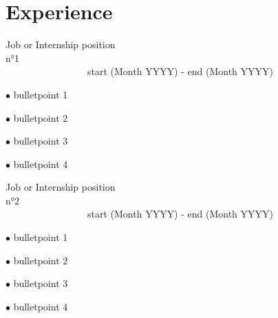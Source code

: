 \documentclass[letterpaper]{article}
\renewenvironment{itemize}{
	\begin{list}{}{
			\setlength{\leftmargin}{1.5em}
		}
	}{
	\end{list}
}
\begin{document}
	\section*{Experience} %
	\begin{itemize}
		\item Job or Internship position n°1\ \ \ \ \ \ \ \ \ \ \ \ \ \ \ \ \ \ \ \ \ \ \ \ \ \ \ \ \ \ \ \ \ \ \ \ \ \ \ \ \ \ \ \ \ \ \ \ \ \ \ \ \ \ \ \ \ \ \ \ \ \ \ \ \ \ \ \ \ \ \ \ \ \ \ \ \ \ \ \ \ \ \ \ \ \ start (Month YYYY) - end (Month YYYY)
		\begin{itemize} %
			\item $\bullet$ bulletpoint 1

			\item $\bullet$ bulletpoint 2

			\item $\bullet$ bulletpoint 3

			\item $\bullet$ bulletpoint 4
		\end{itemize}

		\item Job or Internship position n°2\ \ \ \ \ \ \ \ \ \ \ \ \ \ \ \ \ \ \ \ \ \ \ \ \ \ \ \ \ \ \ \ \ \ \ \ \ \ \ \ \ \ \ \ \ \ \ \ \ \ \ \ \ \ \ \ \ \ \ \ \ \ \ \ \ \ \ \ \ \ \ \ \ \ \ \ \ \ \ \ \ \ \ \ \ \ start (Month YYYY) - end (Month YYYY)
		\begin{itemize}
			\item $\bullet$ bulletpoint 1

			\item $\bullet$ bulletpoint 2

			\item $\bullet$ bulletpoint 3

			\item $\bullet$ bulletpoint 4
		\end{itemize}
	\end{itemize}
\end{document}
